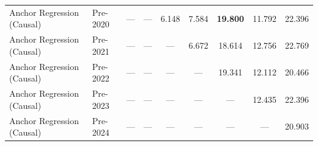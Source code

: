\begin{table}[htbp]
{\begin{tabular}{l lccccccc}
Anchor Regression (Causal) & Pre-2020 & --- & --- & 6.148 & 7.584 & \textbf{19.800} & 11.792 & 22.396 \\
Anchor Regression (Causal) & Pre-2021 & --- & --- & --- & 6.672 & 18.614 & 12.756 & 22.769 \\
Anchor Regression (Causal) & Pre-2022 & --- & --- & --- & --- & 19.341 & 12.112 & 20.466 \\
Anchor Regression (Causal) & Pre-2023 & --- & --- & --- & --- & --- & 12.435 & 22.396 \\
Anchor Regression (Causal) & Pre-2024 & --- & --- & --- & --- & --- & --- & 20.903 \\
\bottomrule
\end{tabular}%
}
\end{table}